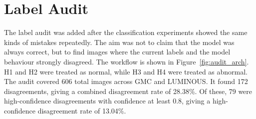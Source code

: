 ﻿\documentclass[12pt,a4paper]{report}
\begin{document}
\section{Label Audit}
The label audit was added after the classification experiments showed the same kinds of mistakes repeatedly. The aim was not to claim that the model was always correct, but to find images where the current labels and the model behaviour strongly disagreed. The workflow is shown in Figure~\ref{fig:audit_arch}. H1 and H2 were treated as normal, while H3 and H4 were treated as abnormal. The audit covered 606 total images across GMC and LUMINOUS. It found 172 disagreements, giving a combined disagreement rate of 28.38\%. Of these, 79 were high-confidence disagreements with confidence at least 0.8, giving a high-confidence disagreement rate of 13.04\%.

\begin{table}[H]
\centering
\scriptsize
{}
\caption{Combined GMC and LUMINOUS image audit summary}
\label{tab:audit_summary}
\end{table}

\begin{table}[H]
\centering
\scriptsize
{}
\caption{Class-wise label audit results}
\label{tab:audit_classwise}
\end{table}
\end{document}
